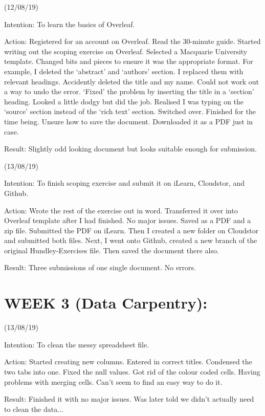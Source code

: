 \documentclass[a4paper,12pt]{article}
\begin{document}
\item(12/08/19)

Intention: To learn the basics of Overleaf.

Action: Registered for an account on Overleaf. Read the 30-minute guide. Started writing out the scoping exercise on Overleaf. Selected a Macquarie University template. Changed bits and pieces to ensure it was the appropriate format. For example, I deleted the ‘abstract’ and ‘authors’ section. I replaced them with relevant headings. Accidently deleted the title and my name. Could not work out a way to undo the error. ‘Fixed’ the problem by inserting the title in a ‘section’ heading. Looked a little dodgy but did the job. Realised I was typing on the ‘source’ section instead of the ‘rich text’ section. Switched over. Finished for the time being. Unsure how to save the document. Downloaded it as a PDF just in case. 

Result: Slightly odd looking document but looks suitable enough for submission. 

\item(13/08/19) 

Intention: To finish scoping exercise and submit it on iLearn, Cloudstor, and Github. 

Action: Wrote the rest of the exercise out in word. Transferred it over into Overleaf template after I had finished. No major issues. Saved as a PDF and a zip file. Submitted the PDF on iLearn. Then I created a new folder on Cloudstor and submitted both files. Next, I went onto Github, created a new branch of the original Hundley-Exercises file. Then saved the document there also. 

Result: Three submissions of one single document. No errors. 

\section{WEEK 3 (Data Carpentry):}

(13/08/19)

Intention: To clean the messy spreadsheet file.

Action: Started creating new columns. Entered in correct titles. Condensed the two tabs into one. Fixed the null values. Got rid of the colour coded cells. Having problems with merging cells. Can’t seem to find an easy way to do it.

Result: Finished it with no major issues. Was later told we didn’t actually need to clean the data...
\end{document}
